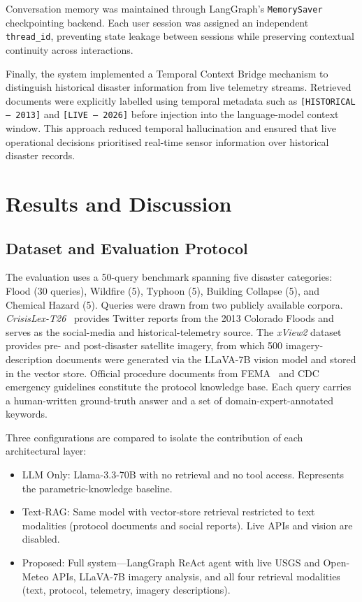 \documentclass[conference]{IEEEtran}
\begin{document}
Conversation memory was maintained through LangGraph’s
\texttt{MemorySaver} checkpointing backend. Each user session was assigned an
independent \texttt{thread\_id}, preventing state leakage between sessions while
preserving contextual continuity across interactions.

Finally, the system implemented a Temporal Context Bridge mechanism to distinguish
historical disaster information from live telemetry streams. Retrieved documents were
explicitly labelled using temporal metadata such as
\texttt{[HISTORICAL --- 2013]} and \texttt{[LIVE --- 2026]} before injection into
the language-model context window. This approach reduced temporal hallucination and
ensured that live operational decisions prioritised real-time sensor information over
historical disaster records.
\section{Results and Discussion}
\label{sec:results}

\subsection{Dataset and Evaluation Protocol}
\label{sec:dataset}

The evaluation uses a 50-query benchmark spanning five disaster
categories: Flood (30 queries), Wildfire (5), Typhoon (5), Building
Collapse (5), and Chemical Hazard (5). Queries were drawn from two
publicly available corpora. \textit{CrisisLex-T26}~\cite{olteanu2014crisislex}
provides Twitter reports from the 2013 Colorado Floods and serves as
the social-media and historical-telemetry source. The
\textit{xView2} dataset~\cite{gupta2019xview2} provides pre- and
post-disaster satellite imagery, from which 500 imagery-description
documents were generated via the LLaVA-7B vision model and stored in
the vector store. Official procedure documents from
FEMA~\cite{fema2021nrp} and CDC emergency guidelines constitute the
protocol knowledge base. Each query carries a human-written
ground-truth answer and a set of domain-expert-annotated keywords.

Three configurations are compared to isolate the contribution of each
architectural layer:

\begin{itemize}
  \item LLM Only: Llama-3.3-70B with no retrieval and no
        tool access. Represents the parametric-knowledge baseline.
  \item Text-RAG: Same model with vector-store retrieval
        restricted to text modalities (protocol documents and social
        reports). Live APIs and vision are disabled.
  \item Proposed: Full system—LangGraph ReAct agent with
        live USGS and Open-Meteo APIs, LLaVA-7B imagery analysis,
        and all four retrieval modalities (text, protocol, telemetry,
        imagery descriptions).
\end{itemize}
\end{document}

